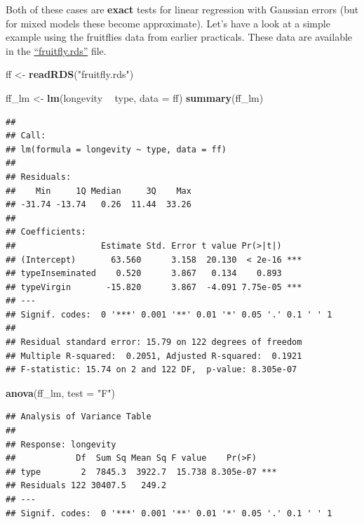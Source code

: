 \documentclass[]{book}
\newenvironment{Shaded}{\begin{snugshade}}{\end{snugshade}}
\newcommand{\KeywordTok}[1]{\textcolor[rgb]{0.13,0.29,0.53}{\textbf{#1}}}
\newcommand{\DataTypeTok}[1]{\textcolor[rgb]{0.13,0.29,0.53}{#1}}
\newcommand{\StringTok}[1]{\textcolor[rgb]{0.31,0.60,0.02}{#1}}
\newcommand{\OperatorTok}[1]{\textcolor[rgb]{0.81,0.36,0.00}{\textbf{#1}}}
\newcommand{\NormalTok}[1]{#1}
\theoremstyle{definition}
\theoremstyle{definition}
\theoremstyle{definition}
\theoremstyle{remark}
\begin{document}
Both of these cases are \textbf{exact} tests for linear regression with
Gaussian errors (but for mixed models these become approximate). Let's
have a look at a simple example using the fruitflies data from earlier
practicals. These data are available in the
\href{https://exeter-data-analytics.github.io/StatModelling/_data/fruitfly.rds}{``fruitfly.rds''}
file.

\begin{Shaded}
\begin{Highlighting}[]
\NormalTok{ff <-}\StringTok{ }\KeywordTok{readRDS}\NormalTok{(}\StringTok{"fruitfly.rds"}\NormalTok{)}
\end{Highlighting}
\end{Shaded}

\newpage

\begin{Shaded}
\begin{Highlighting}[]
\NormalTok{ff_lm <-}\StringTok{ }\KeywordTok{lm}\NormalTok{(longevity }\OperatorTok{~}\StringTok{ }\NormalTok{type, }\DataTypeTok{data =}\NormalTok{ ff)}
\KeywordTok{summary}\NormalTok{(ff_lm)}
\end{Highlighting}
\end{Shaded}

\begin{verbatim}
## 
## Call:
## lm(formula = longevity ~ type, data = ff)
## 
## Residuals:
##    Min     1Q Median     3Q    Max 
## -31.74 -13.74   0.26  11.44  33.26 
## 
## Coefficients:
##                 Estimate Std. Error t value Pr(>|t|)    
## (Intercept)       63.560      3.158  20.130  < 2e-16 ***
## typeInseminated    0.520      3.867   0.134    0.893    
## typeVirgin       -15.820      3.867  -4.091 7.75e-05 ***
## ---
## Signif. codes:  0 '***' 0.001 '**' 0.01 '*' 0.05 '.' 0.1 ' ' 1
## 
## Residual standard error: 15.79 on 122 degrees of freedom
## Multiple R-squared:  0.2051, Adjusted R-squared:  0.1921 
## F-statistic: 15.74 on 2 and 122 DF,  p-value: 8.305e-07
\end{verbatim}

\begin{Shaded}
\begin{Highlighting}[]
\KeywordTok{anova}\NormalTok{(ff_lm, }\DataTypeTok{test =} \StringTok{"F"}\NormalTok{)}
\end{Highlighting}
\end{Shaded}

\begin{verbatim}
## Analysis of Variance Table
## 
## Response: longevity
##            Df  Sum Sq Mean Sq F value    Pr(>F)    
## type        2  7845.3  3922.7  15.738 8.305e-07 ***
## Residuals 122 30407.5   249.2                      
## ---
## Signif. codes:  0 '***' 0.001 '**' 0.01 '*' 0.05 '.' 0.1 ' ' 1
\end{verbatim}
\end{document}
